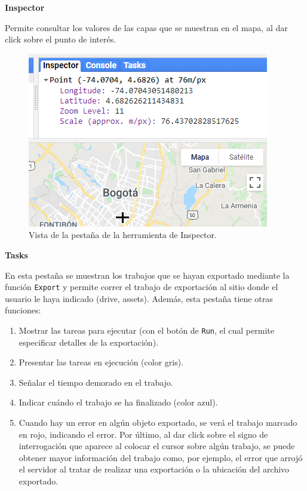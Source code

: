 \documentclass[
  12pt,
  letterpaper,
  twoside]{book}
\providecommand{\tightlist}{%
  \setlength{\itemsep}{0pt}\setlength{\parskip}{0pt}}
\begin{document}
\textbf{Inspector}

Permite consultar los valores de las capas que se muestran en el mapa, al dar click sobre el punto de interés.

\begin{figure}

{\centering \includegraphics[width=0.8\linewidth]{Img/inspector} 

}

\caption{Vista de la pestaña de la herramienta de Inspector.}\label{fig:unnamed-chunk-22}
\end{figure}

\textbf{Tasks}

En esta pestaña se muestran los trabajos que se hayan exportado mediante la función \texttt{Export} y permite correr el trabajo de exportación al sitio donde el usuario le haya indicado (drive, assets). Además, esta pestaña tiene otras funciones:

\begin{enumerate}
\def\labelenumi{\arabic{enumi}.}
\tightlist
\item
  Mostrar las tareas para ejecutar (con el botón de \texttt{Run}, el cual permite especificar detalles de la exportación).
\item
  Presentar las tareas en ejecución (color gris).
\item
  Señalar el tiempo demorado en el trabajo.
\item
  Indicar cuándo el trabajo se ha finalizado (color azul).
\item
  Cuando hay un error en algún objeto exportado, se verá el trabajo marcado en rojo, indicando el error. Por último, al dar click sobre el signo de interrogación que aparece al colocar el cursor sobre algún trabajo, se puede obtener mayor información del trabajo como, por ejemplo, el error que arrojó el servidor al tratar de realizar una exportación o la ubicación del archivo exportado.
\end{enumerate}
\end{document}

